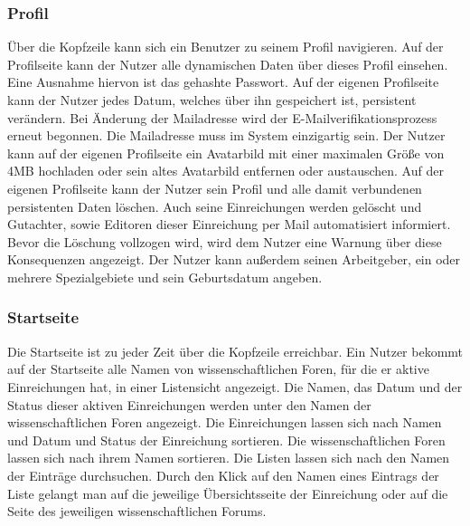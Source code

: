 \subsubsection{Profil}
\begin{description}
     Über die Kopfzeile kann sich ein Benutzer zu seinem Profil navigieren.
     Auf der Profilseite kann der Nutzer alle dynamischen Daten über dieses Profil einsehen.
    Eine Ausnahme hiervon ist das gehashte Passwort. %
     Auf der eigenen Profilseite kann der Nutzer jedes Datum, %
    welches über ihn gespeichert ist, persistent verändern.
     Bei Änderung der Mailadresse wird der E-Mailverifikationsprozess erneut
    begonnen. Die Mailadresse muss im System einzigartig sein. %
     Der Nutzer kann auf der eigenen Profilseite ein Avatarbild mit einer maximalen
    Größe von 4MB hochladen oder sein altes Avatarbild entfernen oder austauschen. %
     Auf der eigenen Profilseite kann der Nutzer sein Profil und alle damit verbundenen persistenten
    Daten löschen. Auch seine Einreichungen werden gelöscht und Gutachter, sowie Editoren dieser
    Einreichung per Mail automatisiert informiert. Bevor die Löschung vollzogen wird, wird dem Nutzer
    eine Warnung über diese Konsequenzen angezeigt.
     Der Nutzer kann außerdem seinen Arbeitgeber, ein oder mehrere Spezialgebiete
    und sein Geburtsdatum angeben.
\end{description}

\subsubsection{Startseite}
\begin{description}
     Die Startseite ist zu jeder Zeit über die Kopfzeile erreichbar.
     Ein Nutzer bekommt auf der Startseite alle Namen von wissenschaftlichen Foren,
    für die er aktive Einreichungen hat, in einer Listensicht angezeigt.
    Die Namen, das Datum und der Status dieser aktiven Einreichungen werden unter den Namen der wissenschaftlichen
    Foren angezeigt.
     Die Einreichungen lassen sich nach Namen und Datum und Status
    der Einreichung sortieren. Die wissenschaftlichen Foren lassen sich nach ihrem Namen sortieren.
     Die Listen lassen sich nach den Namen der Einträge durchsuchen.
     Durch den Klick auf den Namen eines Eintrags der Liste gelangt man auf die jeweilige Übersichtsseite
    der Einreichung oder auf die Seite des jeweiligen wissenschaftlichen Forums.
\end{description}

